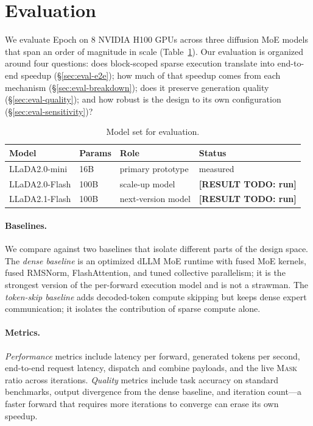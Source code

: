\documentclass[sigconf,review,anonymous, 10pt]{acmart}
\newcommand{\resulttodo}[1]{\textcolor{todored}{\textbf{[RESULT TODO: #1]}}}
\newcommand{\sys}{Epoch}
\newcommand{\mask}{\textsc{Mask}}
\begin{document}
\section{Evaluation}

We evaluate \sys{} on 8 NVIDIA H100 GPUs across three diffusion MoE models that span an order of magnitude in scale (Table~\ref{tab:models}).
Our evaluation is organized around four questions: does block-scoped sparse execution translate into end-to-end speedup (\S\ref{sec:eval-e2e}); how much of that speedup comes from each mechanism (\S\ref{sec:eval-breakdown}); does it preserve generation quality (\S\ref{sec:eval-quality}); and how robust is the design to its own configuration (\S\ref{sec:eval-sensitivity})?

\begin{table}[t]
\centering
\caption{Model set for evaluation.}
\label{tab:models}
\begin{tabular}{llll}
\toprule
Model & Params & Role & Status \\
\midrule
LLaDA2.0-mini & 16B & primary prototype & measured \\
LLaDA2.0-Flash & 100B & scale-up model & \resulttodo{run} \\
LLaDA2.1-Flash & 100B & next-version model & \resulttodo{run} \\
\bottomrule
\end{tabular}
\end{table}

\paragraph{Baselines.}
We compare against two baselines that isolate different parts of the design space.
The \emph{dense baseline} is an optimized dLLM MoE runtime with fused MoE kernels, fused RMSNorm, FlashAttention, and tuned collective parallelism; it is the strongest version of the per-forward execution model and is not a strawman.
The \emph{token-skip baseline} adds decoded-token compute skipping but keeps dense expert communication; it isolates the contribution of sparse compute alone.

\paragraph{Metrics.}
\emph{Performance} metrics include latency per forward, generated tokens per second, end-to-end request latency, dispatch and combine payloads, and the live \mask{} ratio across iterations.
\emph{Quality} metrics include task accuracy on standard benchmarks, output divergence from the dense baseline, and iteration count---a faster forward that requires more iterations to converge can erase its own speedup.
\end{document}
